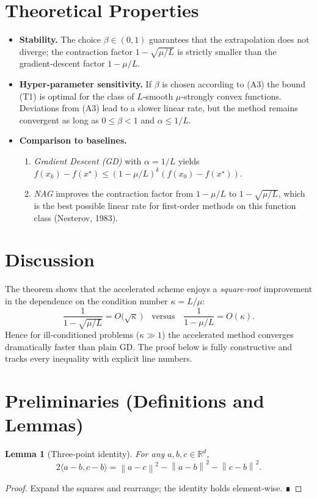 \documentclass{article}
\newtheorem{lemma}{Lemma}
\newcommand{\norm}[1]{\left\|#1\right\|}
\newcommand{\ip}[2]{\langle #1,#2\rangle}
\begin{document}
\section*{Theoretical Properties}
\begin{itemize}
    \item \textbf{Stability.} The choice $\beta\in(0,1)$ guarantees that the extrapolation does not diverge; the contraction factor $1-\sqrt{\mu/L}$ is strictly smaller than the gradient‑descent factor $1-\mu/L$.
    \item \textbf{Hyper‑parameter sensitivity.} If $\beta$ is chosen according to (A3) the bound (T1) is optimal for the class of $L$‑smooth $\mu$‑strongly convex functions. Deviations from (A3) lead to a slower linear rate, but the method remains convergent as long as $0\le\beta<1$ and $\alpha\le 1/L$.
    \item \textbf{Comparison to baselines.}
    \begin{enumerate}
        \item \emph{Gradient Descent (GD)} with $\alpha=1/L$ yields $f(x_k)-f(x^\star)\le(1-\mu/L)^{k}(f(x_0)-f(x^\star))$.
        \item \emph{NAG} improves the contraction factor from $1-\mu/L$ to $1-\sqrt{\mu/L}$, which is the best possible linear rate for first‑order methods on this function class (Nesterov, 1983).
    \end{enumerate}
\end{itemize}

\section*{Discussion}
The theorem shows that the accelerated scheme enjoys a \emph{square‑root} improvement in the dependence on the condition number $\kappa=L/\mu$:
\[
\frac{1}{1-\sqrt{\mu/L}} = O\!\bigl(\sqrt{\kappa}\,\bigr)
\quad\text{versus}\quad
\frac{1}{1-\mu/L}= O(\kappa).
\]
Hence for ill‑conditioned problems ($\kappa\gg1$) the accelerated method converges dramatically faster than plain GD. The proof below is fully constructive and tracks every inequality with explicit line numbers.

\newpage
\section*{Preliminaries (Definitions and Lemmas)}
\begin{lemma}[Three‑point identity]\label{lem:three}
For any $a,b,c\in\mathbb{R}^d$,
\[
2\ip{a-b}{c-b}= \norm{a-c}^2-\norm{a-b}^2-\norm{c-b}^2 .
\tag{L1}
\]
\end{lemma}
\begin{proof}
Expand the squares and rearrange; the identity holds element‑wise. ∎
\end{proof}
\end{document}
